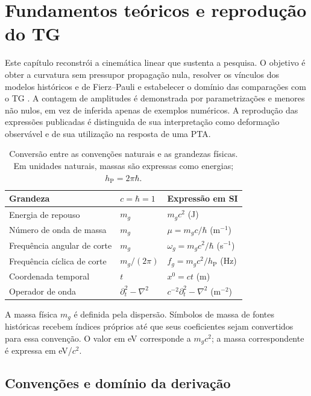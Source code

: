 \chapter[Fundamentos teóricos]{Fundamentos teóricos e reprodução do TG}
\label{chap:fundamentos}

Este capítulo reconstrói a cinemática linear que sustenta a pesquisa.
O objetivo é obter a curvatura sem pressupor propagação nula, resolver
os vínculos dos modelos históricos e de Fierz--Pauli e estabelecer o
domínio das comparações com o TG \autocite{tg2003}. A contagem de
amplitudes é demonstrada por parametrizações e menores não nulos,
em vez de inferida apenas de exemplos numéricos. A reprodução das
expressões publicadas é distinguida de sua interpretação como
deformação observável e de sua utilização na resposta de uma PTA.

\begin{table}[!ht]
\centering
\caption{Conversão entre as convenções naturais e as grandezas físicas. Em unidades naturais, massas são expressas como energias; $h_{\mathrm P}=2\pi\hbar$.}
\label{tab:fund-unidades}
\begin{tabular}{lll}
\toprule
Grandeza & $c=\hbar=1$ & Expressão em SI\\
\midrule
Energia de repouso & $m_g$ & $m_gc^2$ (J)\\
Número de onda de massa & $m_g$ & $\mu=m_gc/\hbar$ (m$^{-1}$)\\
Frequência angular de corte & $m_g$ & $\omega_g=m_gc^2/\hbar$ (s$^{-1}$)\\
Frequência cíclica de corte & $m_g/(2\pi)$ & $f_g=m_gc^2/h_{\mathrm P}$ (Hz)\\
Coordenada temporal & $t$ & $x^0=ct$ (m)\\
Operador de onda & $\partial_t^2-\nabla^2$ & $c^{-2}\partial_t^2-\nabla^2$ (m$^{-2}$)\\
\bottomrule
\end{tabular}
\end{table}
A massa física $m_g$ é definida pela dispersão. Símbolos de massa de fontes históricas recebem índices próprios até que seus coeficientes sejam convertidos para essa convenção. O valor em eV corresponde a $m_gc^2$; a massa correspondente é expressa em eV/$c^2$.

\section{Convenções e domínio da derivação}

